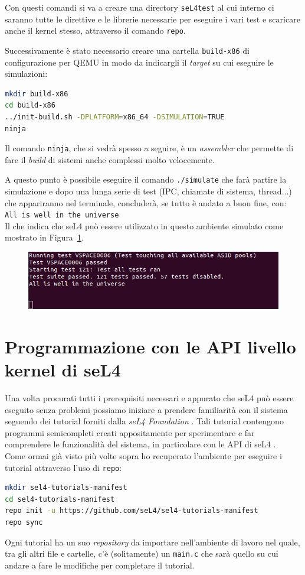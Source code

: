 Con questi comandi si va a creare una directory \texttt{seL4test} al cui interno ci saranno tutte le direttive e le librerie necessarie per eseguire i vari test e scaricare anche il kernel stesso, attraverso il comando \texttt{repo}.

Successivamente è stato necessario creare una cartella \texttt{build-x86} di configurazione per QEMU in modo da indicargli il \textit{target} su cui eseguire le simulazioni:
\begin{lstlisting}[language=bash]
mkdir build-x86
cd build-x86
../init-build.sh -DPLATFORM=x86_64 -DSIMULATION=TRUE
ninja
\end{lstlisting}

Il comando \texttt{ninja}, che si vedrà spesso a seguire, è un \textit{assembler} che permette di fare il \textit{build} di sistemi anche complessi molto velocemente.

A questo punto è possibile eseguire il comando \texttt{./simulate} che farà partire la simulazione e dopo una lunga serie di test (IPC, chiamate di sistema, thread...) che appariranno nel terminale, concluderà, se tutto è andato a buon fine, con:\\
\texttt{All is well in the universe}\\
Il che indica che seL4 può essere utilizzato in questo ambiente simulato come mostrato in Figura~\ref{fig:Prima simulazione}.
\begin{figure}[H]
  \includegraphics[width=\linewidth]{img/PrimaSimulazione.png}
  \label{fig:Prima simulazione}
\end{figure}

\section{Programmazione con le API livello kernel di seL4}
Una volta procurati tutti i prerequisiti necessari e appurato che seL4 può essere eseguito senza problemi possiamo iniziare a prendere familiarità con il sistema seguendo dei tutorial forniti dalla \textit{seL4 Foundation} \cite{seL4Tutorial}. Tali tutorial contengono programmi semicompleti creati appositamente per sperimentare e far comprendere le funzionalità del sistema, in particolare con le API di seL4 \cite{sel4API}.\\
Come ormai già visto più volte sopra ho recuperato l'ambiente per eseguire i tutorial attraverso l'uso di \texttt{repo}:
\begin{lstlisting}[language=bash]
mkdir sel4-tutorials-manifest
cd sel4-tutorials-manifest
repo init -u https://github.com/seL4/sel4-tutorials-manifest
repo sync
\end{lstlisting}
Ogni tutorial ha un suo \textit{repository} da importare nell'ambiente di lavoro nel quale, tra gli altri file e cartelle, c'è (solitamente) un \texttt{main.c} che sarà quello su cui andare a fare le modifiche per completare il tutorial.

